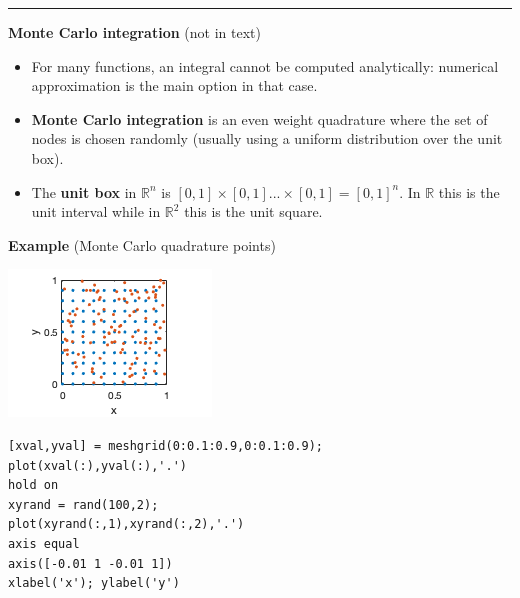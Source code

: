 \documentclass[12pt,letterpaper,noanswers]{exam}
\begin{document}




\vspace{0.2cm}
\hrule
\vspace{0.2cm}



\noindent\textbf{Monte Carlo integration} (not in text)
\begin{tcolorbox}
\begin{itemize}
\itemsep0em
\item For many functions, an integral cannot be computed analytically: numerical approximation is the main option in that case.
    \item \textbf{Monte Carlo integration} is an even weight quadrature where the set of nodes is chosen randomly (usually using a uniform distribution over the unit box).
    \item The \textbf{unit box} in $\mathbb{R}^n$ is $[0,1]\times [0,1] ...\times [0,1] = [0,1]^n$.  In $\mathbb{R}$ this is the unit interval while in $\mathbb{R}^2$ this is the unit square.
\end{itemize}
\end{tcolorbox}

\noindent\textbf{Example} (Monte Carlo quadrature points)

\begin{multicols}{2}
\includegraphics{img/C15domain.png}

\begin{lstlisting}
[xval,yval] = meshgrid(0:0.1:0.9,0:0.1:0.9);
plot(xval(:),yval(:),'.')
hold on
xyrand = rand(100,2);
plot(xyrand(:,1),xyrand(:,2),'.')
axis equal
axis([-0.01 1 -0.01 1])
xlabel('x'); ylabel('y')
\end{lstlisting}
\end{multicols}
\end{document}

